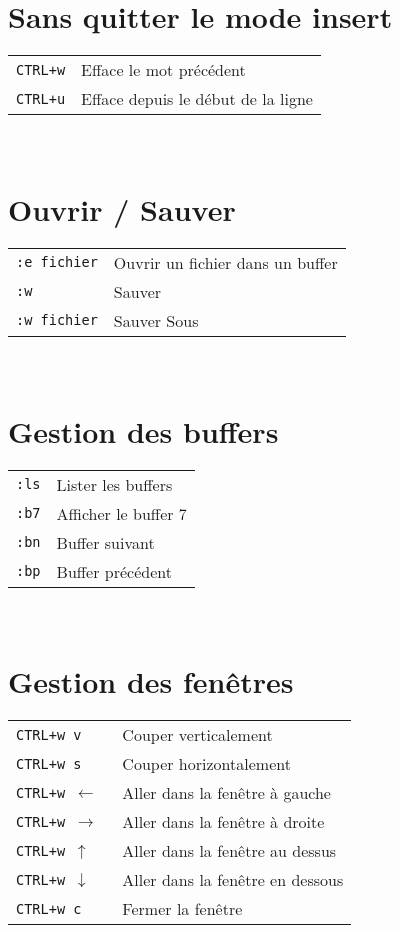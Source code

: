 \documentclass[8pt,landscape,a4paper]{article}
\begin{document}
\begin{multicols*}{3}
    \section{ Sans quitter le mode insert}
    \begin{tabular}{m{2cm} l}
        \texttt{CTRL+w} & Efface le mot précédent\\
        \texttt{CTRL+u} & Efface depuis le début de la ligne\\
    \end{tabular}\\

    \section{Ouvrir / Sauver}
    \begin{tabular}{m{2cm} l}
        \texttt{:e fichier}& Ouvrir un fichier dans un buffer\\
        \texttt{:w}& Sauver\\
        \texttt{:w fichier}& Sauver Sous \\
    \end{tabular}\\
    \section{Gestion des buffers}
    \begin{tabular}{m{2cm} l}
        \texttt{:ls}& Lister les buffers\\
        \texttt{:b7}& Afficher le buffer 7\\
        \texttt{:bn}& Buffer suivant\\
        \texttt{:bp}& Buffer précédent\\
    \end{tabular}\\

    \section{Gestion des fenêtres}
    \begin{tabular}{m{2cm} l}
        \texttt{CTRL+w v}& Couper verticalement\\
        \texttt{CTRL+w s}& Couper horizontalement\\
        \texttt{CTRL+w $\leftarrow$ }& Aller dans la fenêtre à gauche\\
        \texttt{CTRL+w $\rightarrow$ }&Aller dans la fenêtre à droite\\
        \texttt{CTRL+w $\uparrow$ }&Aller dans la fenêtre au dessus\\
        \texttt{CTRL+w $\downarrow$ }&Aller dans la fenêtre en dessous\\
        \texttt{CTRL+w c }&Fermer la fenêtre\\
    \end{tabular}\\


\end{multicols*}
\end{document}
